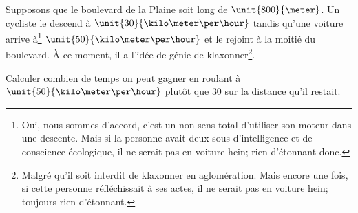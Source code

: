 
\begin{exercice}\label{exoMRU0001}

	Supposons que le boulevard de la Plaine soit long de $\unit{800}{\meter}$. Un cycliste le descend à $\unit{30}{\kilo\meter\per\hour}$ tandis qu'une voiture arrive à\footnote{Oui, nous sommes d'accord, c'est un non-sens total d'utiliser son moteur dans une descente. Mais si la personne avait deux sous d'intelligence et de conscience écologique, il ne serait pas en voiture hein; rien d'étonnant donc.} $\unit{50}{\kilo\meter\per\hour}$ et le rejoint à la moitié du boulevard. À ce moment, il a l'idée de génie de klaxonner\footnote{Malgré qu'il soit interdit de klaxonner en aglomération. Mais encore une fois, si cette personne réfléchissait à ses actes, il ne serait pas en voiture hein; toujours rien d'étonnant.}.

	Calculer combien de temps on peut gagner en roulant à $\unit{50}{\kilo\meter\per\hour}$ plutôt que $30$ sur la distance qu'il restait.

\end{exercice}
